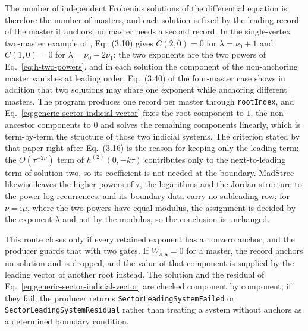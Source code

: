 \documentclass[11pt,a4paper]{article}
\newcommand{\ii}{\mathrm i}
\begin{document}
The number of independent Frobenius solutions of the differential equation is therefore the number of masters, and each solution is fixed by the leading record of the master it anchors; no master needs a second record. In the single-vertex two-master example of \cite{Chen:2024jms}, Eq.~(3.10) gives $C(2,0)=0$ for $\lambda=\nu_0+1$ and $C(1,0)=0$ for $\lambda=\nu_0-2\nu_1$: the two exponents are the two powers of Eq.~\eqref{eq:h-two-powers}, and in each solution the component of the non-anchoring master vanishes at leading order. Eq.~(3.40) of the four-master case shows in addition that two solutions may share one exponent while anchoring different masters. The program produces one record per master through \texttt{rootIndex}, and Eq.~\eqref{eq:generic-sector-indicial-vector} fixes the root component to $1$, the non-ancestor components to $0$ and solves the remaining components linearly, which is term-by-term the structure of those two indicial systems. The criterion stated by that paper right after Eq.~(3.16) is the reason for keeping only the leading term: the $O(\tau^{-2\nu})$ term of $h^{(2)}(0,-k\tau)$ contributes only to the next-to-leading term of solution two, so its coefficient is not needed at the boundary. MadStree likewise leaves the higher powers of $\tau$, the logarithms and the Jordan structure to the power-log recurrences, and its boundary data carry no subleading row; for $\nu=\ii\mu$, where the two powers have equal modulus, the assignment is decided by the exponent $\lambda$ and not by the modulus, so the conclusion is unchanged.

This route closes only if every retained exponent has a nonzero anchor, and the producer guards that with two gates. If $W_{s,\bm a}=0$ for a master, the record anchors no solution and is dropped, and the value of that component is supplied by the leading vector of another root instead. The solution and the residual of Eq.~\eqref{eq:generic-sector-indicial-vector} are checked component by component; if they fail, the producer returns \texttt{SectorLeadingSystemFailed} or \texttt{SectorLeadingSystemResidual} rather than treating a system without anchors as a determined boundary condition.
\end{document}

